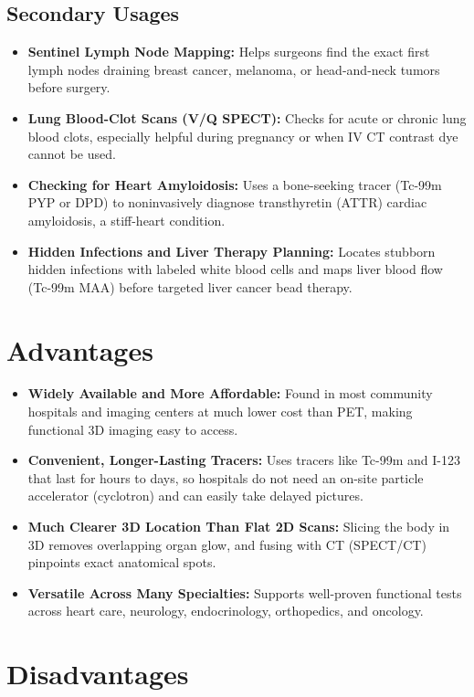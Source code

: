 \subsection{Secondary Usages}

\begin{itemize}
    \item \textbf{Sentinel Lymph Node Mapping:} Helps surgeons find the exact first lymph nodes draining breast cancer, melanoma, or head-and-neck tumors before surgery.
    \item \textbf{Lung Blood-Clot Scans (V/Q SPECT):} Checks for acute or chronic lung blood clots, especially helpful during pregnancy or when IV CT contrast dye cannot be used.
    \item \textbf{Checking for Heart Amyloidosis:} Uses a bone-seeking tracer (Tc-99m PYP or DPD) to noninvasively diagnose transthyretin (ATTR) cardiac amyloidosis, a stiff-heart condition.
    \item \textbf{Hidden Infections and Liver Therapy Planning:} Locates stubborn hidden infections with labeled white blood cells and maps liver blood flow (Tc-99m MAA) before targeted liver cancer bead therapy.
\end{itemize}

\section{Advantages}

\begin{itemize}
    \item \textbf{Widely Available and More Affordable:} Found in most community hospitals and imaging centers at much lower cost than PET, making functional 3D imaging easy to access.
    \item \textbf{Convenient, Longer-Lasting Tracers:} Uses tracers like Tc-99m and I-123 that last for hours to days, so hospitals do not need an on-site particle accelerator (cyclotron) and can easily take delayed pictures.
    \item \textbf{Much Clearer 3D Location Than Flat 2D Scans:} Slicing the body in 3D removes overlapping organ glow, and fusing with CT (SPECT/CT) pinpoints exact anatomical spots.
    \item \textbf{Versatile Across Many Specialties:} Supports well-proven functional tests across heart care, neurology, endocrinology, orthopedics, and oncology.
\end{itemize}

\section{Disadvantages}


